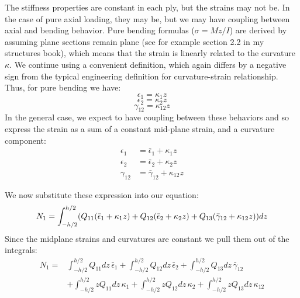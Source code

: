 \documentclass{article}
\begin{document}
The stiffness properties are constant in each ply, but the strains may not be.  In the case of pure axial loading, they may be, but we may have coupling between axial and bending behavior.  Pure bending formulas ($\sigma = Mz/I$) are derived by assuming plane sections remain plane (see for example section 2.2 in my structures book), which means that the strain is linearly related to the curvature $\kappa$.  We continue using a convenient definition, which again differs by a negative sign from the typical engineering definition for curvature-strain relationship.  Thus, for pure bending we have:
\begin{equation}
\epsilon_1 = \kappa_1 z
\end{equation}
\begin{equation}
\epsilon_2 = \kappa_2 z
\end{equation}
\begin{equation}
\gamma_{12} = \kappa_{12} z
\end{equation}
In the general case, we expect to have coupling between these behaviors and so express the strain as a sum of a constant mid-plane strain, and a curvature component:
\begin{equation}
    \begin{aligned}
        \epsilon_1 &= \bar\epsilon_1 + \kappa_1 z \\
        \epsilon_2 &= \bar\epsilon_2 + \kappa_2 z \\
        \gamma_{12} &= \bar\gamma_{12} + \kappa_{12} z
    \end{aligned}
    \label{eq:straincurvature}
\end{equation}

We now substitute these expression into our equation:
\begin{equation}
N_1 = \int_{-h/2}^{h/2} (Q_{11} (\bar\epsilon_1 + \kappa_1 z) + Q_{12} (\bar\epsilon_2 + \kappa_2 z) + Q_{13} (\bar\gamma_{12} + \kappa_{12} z)) dz\\
\end{equation}
Since the midplane strains and curvatures are constant we pull them out of the integrals:
\begin{equation}
\begin{aligned}
N_1 =& \int_{-h/2}^{h/2} Q_{11} dz\, \bar\epsilon_1 + \int_{-h/2}^{h/2} Q_{12} dz\, \bar\epsilon_2 + \int_{-h/2}^{h/2} Q_{13} dz\, \bar\gamma_{12} \\ &+ \int_{-h/2}^{h/2} z Q_{11} dz\, \kappa_1 + \int_{-h/2}^{h/2} z Q_{12} dz\, \kappa_2 + \int_{-h/2}^{h/2} z Q_{13} dz\, \kappa_{12}
\end{aligned}
\end{equation}
\end{document}
